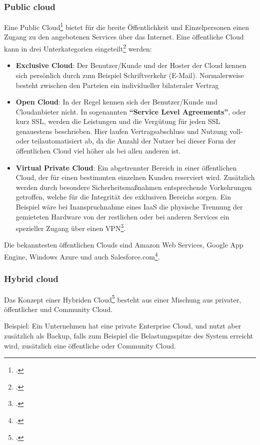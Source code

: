 \subsubsection{Public cloud}
Eine Public Cloud\footcite{cloud-ms-ph} bietet für die breite Öffentlichkeit und Einzelpersonen einen Zugang zu den angebotenen Services über das Internet.
Eine öffentliche Cloud kann in drei Unterkategorien eingeteilt\footcite{Lehrunterlagen-HTL-cloud} werden:
\begin{itemize}
	\item \textbf{Exclusive Cloud}: Der Benutzer/Kunde und der Hoster der Cloud kennen sich persönlich durch zum Beispiel Schriftverkehr (E-Mail). Normalerweise besteht zwischen den Parteien ein individueller bilateraler Vertrag
	\item \textbf{Open Cloud}: In der Regel kennen sich der Benutzer/Kunde und Cloudanbieter nicht. In sogenannten \textbf{"`Service Level Agreements"'}, oder kurz SSL, werden die Leistungen und die Vergütung für jeden SSL genauestens beschrieben. Hier laufen Vertragsabschluss und Nutzung voll- oder teilautomatisiert ab, da die Anzahl der Nutzer bei dieser Form der öffentlichen Cloud viel höher als bei allen anderen ist.
	\item \textbf{Virtual Private Cloud}: Ein abgetrennter Bereich in einer öffentlichen Cloud, der für einen bestimmten einzelnen Kunden reserviert wird. Zusätzlich werden durch besondere Sicherheitsmaßnahmen entsprechende Vorkehrungen getroffen, welche für die Integrität des exklusiven Bereichs sorgen. Ein Beispiel wäre bei Inanspruchnahme eines IaaS die physische Trennung der gemieteten Hardware von der restlichen oder bei anderen Services ein spezieller Zugang über einen VPN\footcite{Lehrunterlagen-HTL-cloud}.
\end{itemize}
Die bekanntesten öffentlichen Clouds sind Amazon Web Services, Google App Engine, Windows Azure und auch Salesforce.com\footcite{cloud-computing}.

\subsubsection{Hybrid cloud}
Das Konzept einer Hybriden Cloud\footcite{cloud-ms-ph} besteht aus einer Mischung aus privater, öffentlicher und Community Cloud.

Beispiel: Ein Unternehmen hat eine private Enterprise Cloud, und nutzt aber zusätzlich als Backup, falls zum Beispiel die Belastungsspitze des System erreicht wird, zusätzlich eine öffentliche oder Community Cloud.
